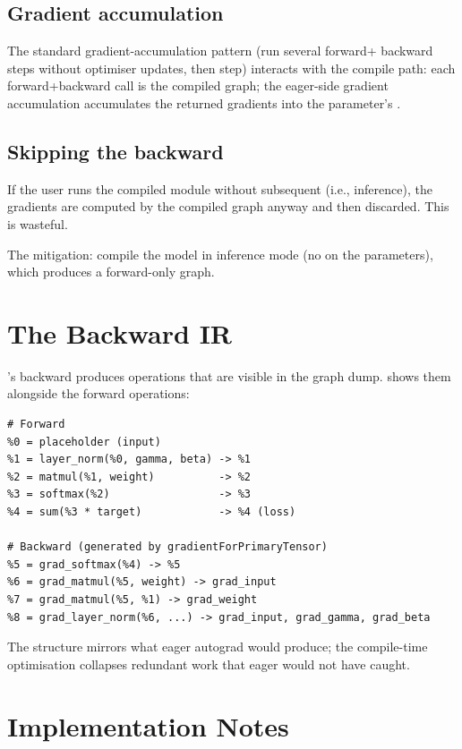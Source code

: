 \subsection{Gradient accumulation}
\label{ssec:fwd_bwd_compile:grad_accumulation}

The standard gradient-accumulation pattern (run several forward+
backward steps without optimiser updates, then step) interacts
with the compile path: each forward+backward call is the
compiled graph; the eager-side gradient accumulation accumulates
the returned gradients into the parameter's .

\subsection{Skipping the backward}
\label{ssec:fwd_bwd_compile:skip_backward}

If the user runs the compiled module without subsequent
 (i.e., inference), the gradients are
computed by the compiled graph anyway and then discarded. This
is wasteful.

The mitigation: compile the model in inference mode (no
 on the parameters), which produces a
forward-only graph.

\section{The Backward IR}
\label{sec:fwd_bwd_compile:backward_ir}

\MPSGraph's backward produces operations that are visible in the
graph dump.  shows them alongside the
forward operations:

\begin{verbatim}
# Forward
%0 = placeholder (input)
%1 = layer_norm(%0, gamma, beta) -> %1
%2 = matmul(%1, weight)          -> %2
%3 = softmax(%2)                 -> %3
%4 = sum(%3 * target)            -> %4 (loss)

# Backward (generated by gradientForPrimaryTensor)
%5 = grad_softmax(%4) -> %5
%6 = grad_matmul(%5, weight) -> grad_input
%7 = grad_matmul(%5, %1) -> grad_weight
%8 = grad_layer_norm(%6, ...) -> grad_input, grad_gamma, grad_beta
\end{verbatim}

The structure mirrors what eager autograd would produce; the
compile-time optimisation collapses redundant work that eager
would not have caught.

\section{Implementation Notes}
\label{sec:fwd_bwd_compile:impl_notes}


